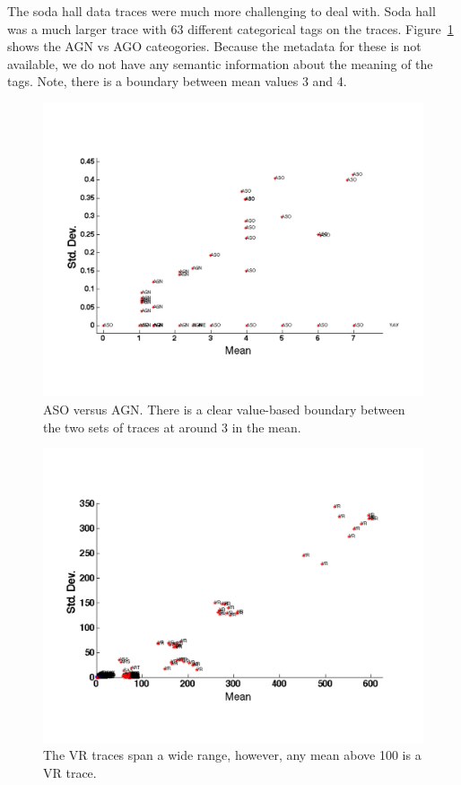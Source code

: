 The soda hall data traces were much more challenging to deal with. Soda hall was a much larger trace with 63 different
categorical tags on the traces.  Figure~\ref{fig:asovsagn} shows the AGN vs AGO cateogories.  Because the metadata for these is
not available, we do not have any semantic information about the meaning of the tags.  Note, there is a boundary between
mean values 3 and 4.

\begin{figure}[t!] %
\centering
\includegraphics[width=0.8\columnwidth]{figs/ASOvsAGN}
\caption{ASO versus AGN.  There is a clear value-based boundary between the two sets of traces at around 3 in the mean.}
\label{fig:asovsagn}
\end{figure}

\begin{figure}[t!] %
\centering
\includegraphics[width=0.8\columnwidth]{figs/VR}
\caption{The VR traces span a wide range, however, any mean above 100 is a VR trace.}
\label{fig:vr}
\end{figure}


